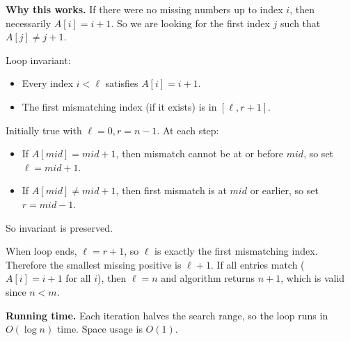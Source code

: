 \documentclass[10pt]{article}
\begin{document}
\textbf{Why this works.}
If there were no missing numbers up to index $i$, then necessarily $A[i]=i+1$.
So we are looking for the first index $j$ such that $A[j]\ne j+1$.

Loop invariant:
\begin{itemize}
    \item Every index $i<\ell$ satisfies $A[i]=i+1$.
    \item The first mismatching index (if it exists) is in $[\ell,r+1]$.
\end{itemize}
Initially true with $\ell=0,r=n-1$.  
At each step:
\begin{itemize}
    \item If $A[mid]=mid+1$, then mismatch cannot be at or before $mid$, so set $\ell=mid+1$.
    \item If $A[mid]\ne mid+1$, then first mismatch is at $mid$ or earlier, so set $r=mid-1$.
\end{itemize}
So invariant is preserved.

When loop ends, $\ell=r+1$, so $\ell$ is exactly the first mismatching index. Therefore the smallest missing positive is $\ell+1$.
If all entries match ($A[i]=i+1$ for all $i$), then $\ell=n$ and algorithm returns $n+1$, which is valid since $n<m$.

\textbf{Running time.}
Each iteration halves the search range, so the loop runs in $O(\log n)$ time.
Space usage is $O(1)$.
 
\end{document}
